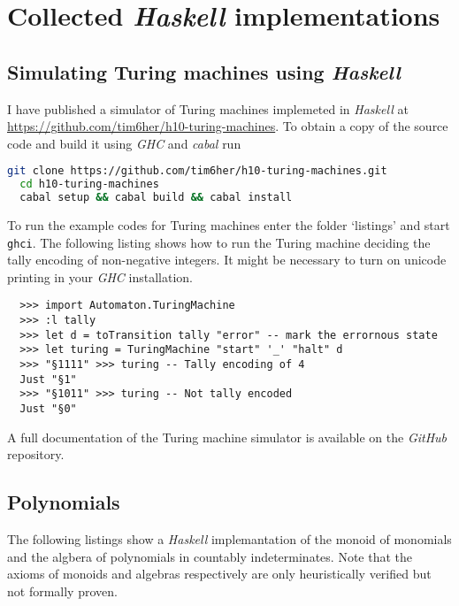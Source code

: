\section{Collected \emph{Haskell} implementations}

\subsection{Simulating Turing machines using \emph{Haskell}}%
\label{app:turing}%

I have published a simulator of Turing machines implemeted in \emph{Haskell}
at \url{https://github.com/tim6her/h10-turing-machines}. To obtain a copy of
the source code and build it using \emph{GHC} and \emph{cabal} run

\begin{lstlisting}[language=bash]
  git clone https://github.com/tim6her/h10-turing-machines.git
  cd h10-turing-machines
  cabal setup && cabal build && cabal install
\end{lstlisting}

To run the example codes for Turing machines enter the folder ‘listings’ and
start \verb+ghci+. The following listing shows how to run the Turing machine
deciding the tally encoding of non-negative integers. It might be necessary to
turn on unicode printing in your \emph{GHC} installation.

\begin{lstlisting}
  >>> import Automaton.TuringMachine
  >>> :l tally
  >>> let d = toTransition tally "error" -- mark the errornous state
  >>> let turing = TuringMachine "start" '_' "halt" d
  >>> "§1111" >>> turing -- Tally encoding of 4
  Just "§1"
  >>> "§1011" >>> turing -- Not tally encoded
  Just "§0"
\end{lstlisting}

A full documentation of the Turing machine simulator is available on the
\emph{GitHub} repository.

\subsection{Polynomials} \label{app:polynomials}

The following listings show a \emph{Haskell} implemantation of the monoid of
monomials and the algbera of polynomials in countably indeterminates. Note that
the axioms of monoids and algebras respectively are only heuristically verified
but not formally proven.




